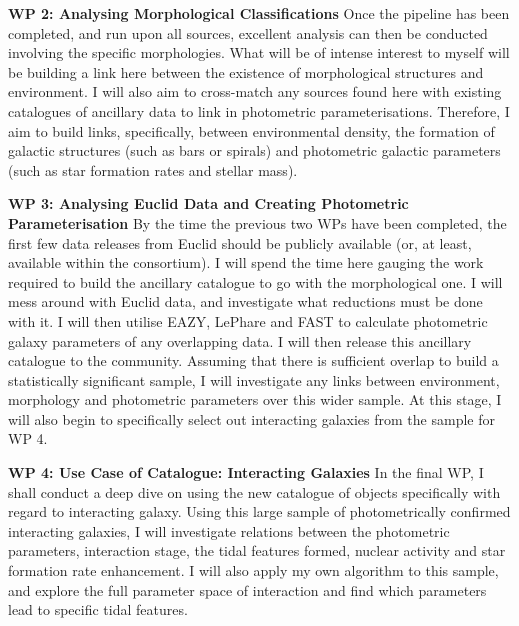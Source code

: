 \documentclass[11pt,usenatbib]{article}
\begin{document}
\noindent \textbf{WP 2: Analysing Morphological Classifications} Once the pipeline has been completed, and run upon all sources, excellent analysis can then be conducted involving the specific morphologies. What will be of intense interest to myself will be building a link here between the existence of morphological structures and environment. I will also aim to cross-match any sources found here with existing catalogues of ancillary data to link in photometric parameterisations. Therefore, I aim to build links, specifically, between environmental density, the formation of galactic structures (such as bars or spirals) and photometric galactic parameters (such as star formation rates and stellar mass).

\noindent \textbf{WP 3: Analysing Euclid Data and Creating Photometric Parameterisation} By the time the previous two WPs have been completed, the first few data releases from Euclid should be publicly available (or, at least, available within the consortium). I will spend the time here gauging the work required to build the ancillary catalogue to go with the morphological one. I will mess around with Euclid data, and investigate what reductions must be done with it. I will then utilise EAZY, LePhare and FAST to calculate photometric galaxy parameters of any overlapping data. I will then release this ancillary catalogue to the community. Assuming that there is sufficient overlap to build a statistically significant sample, I will investigate any links between environment, morphology and photometric parameters over this wider sample. At this stage, I will also begin to specifically select out interacting galaxies from the sample for WP 4.

\noindent \textbf{WP 4: Use Case of Catalogue: Interacting Galaxies} In the final WP, I shall conduct a deep dive on using the new catalogue of objects specifically with regard to interacting galaxy. Using this large sample of photometrically confirmed interacting galaxies, I will investigate relations between the photometric parameters, interaction stage, the tidal features formed, nuclear activity and star formation rate enhancement. I will also apply my own algorithm to this sample, and explore the full parameter space of interaction and find which parameters lead to specific tidal features.
\\
\\
\end{document}
